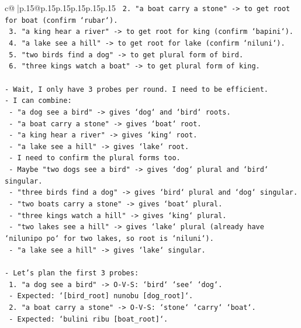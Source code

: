\documentclass{article}
\begin{document}
{\begin{supertabular}{c@{$\;$}|p{.15\linewidth}@{}p{.15\linewidth}p{.15\linewidth}p{.15\linewidth}p{.15\linewidth}p{.15\linewidth}}
{{{\texttt{  2. "a boat carry a stone" {-}> to get root for boat (confirm `rubar`).} \\
\texttt{  3. "a king hear a river" {-}> to get root for king (confirm `bapini`).} \\
\texttt{  4. "a lake see a hill" {-}> to get root for lake (confirm `niluni`).} \\
\texttt{  5. "two birds find a dog" {-}> to get plural form of bird.} \\
\texttt{  6. "three kings watch a boat" {-}> to get plural form of king.} \\
\\ 
\texttt{{-} Wait, I only have 3 probes per round. I need to be efficient.} \\
\texttt{{-} I can combine:} \\
\texttt{  {-} "a dog see a bird" {-}> gives `dog` and `bird` roots.} \\
\texttt{  {-} "a boat carry a stone" {-}> gives `boat` root.} \\
\texttt{  {-} "a king hear a river" {-}> gives `king` root.} \\
\texttt{  {-} "a lake see a hill" {-}> gives `lake` root.} \\
\texttt{  {-} I need to confirm the plural forms too.} \\
\texttt{  {-} Maybe "two dogs see a bird" {-}> gives `dog` plural and `bird` singular.} \\
\texttt{  {-} "three birds find a dog" {-}> gives `bird` plural and `dog` singular.} \\
\texttt{  {-} "two boats carry a stone" {-}> gives `boat` plural.} \\
\texttt{  {-} "three kings watch a hill" {-}> gives `king` plural.} \\
\texttt{  {-} "two lakes see a hill" {-}> gives `lake` plural (already have `nilunipo po` for two lakes, so root is `niluni`).} \\
\texttt{  {-} "a lake see a hill" {-}> gives `lake` singular.} \\
\\ 
\texttt{{-} Let's plan the first 3 probes:} \\
\texttt{  1. "a dog see a bird" {-}> O{-}V{-}S: `bird` `see` `dog`.} \\
\texttt{     {-} Expected: `{[}bird\_root{]} nunobu {[}dog\_root{]}`.} \\
\texttt{  2. "a boat carry a stone" {-}> O{-}V{-}S: `stone` `carry` `boat`.} \\
\texttt{     {-} Expected: `bulini ribu {[}boat\_root{]}`.} \\
}}}
\end{supertabular}}
\end{document}

